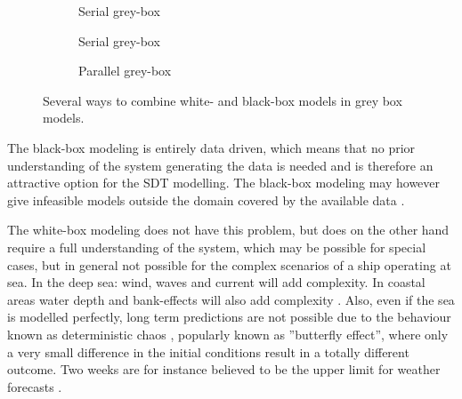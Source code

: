 \begin{figure}[H]
    \centering
    \begin{subfigure}[b]{0.3\textwidth}
    \centering
    \caption{Serial grey-box}
    \label{fig:serial1}
    \end{subfigure}

    
    \begin{subfigure}[b]{0.3\textwidth}
    \centering
    \caption{Serial grey-box}
    \label{fig:serial2}
    \end{subfigure}

    \begin{subfigure}[b]{0.3\textwidth}
    \centering
    \caption{Parallel grey-box}
    \label{fig:parallel}
    \end{subfigure}
    \caption{Several ways to combine white- and black-box models in grey box models.}
    \label{fig:greycombinations}
\end{figure}

\noindent The black-box modeling is entirely data driven, which means that no prior understanding of the system generating the data is needed and is therefore an attractive option for the SDT modelling. The black-box modeling may however give infeasible models outside the domain covered by the available data \cite{nielsen_machine_2022}. 

The white-box modeling does not have this problem, but does on the other hand require a full understanding of the system, which may be possible for special cases, but in general not possible for the complex scenarios of a ship operating at sea. 
In the deep sea: wind, waves and current will add complexity. In coastal areas water depth and bank-effects will also add complexity \cite{nielsen_machine_2022}. 
Also, even if the sea is modelled perfectly, long term predictions are not possible due to the behaviour known as deterministic chaos \cite{lorenz_deterministic_1963}, popularly known as ''butterfly effect'', where only a very small difference in the initial conditions result in a totally different outcome. Two weeks are for instance believed to be the upper limit for weather forecasts  \cite{zhang_what_2019}. 

